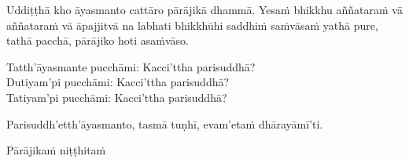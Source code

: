 \medskip

\begin{center}
Uddiṭṭhā kho āyasmanto cattāro pārājikā dhammā. Yesaṁ bhikkhu aññataraṁ vā aññataraṁ vā āpajjitvā na labhati bhikkhūhi saddhiṁ saṁvāsaṁ yathā pure, tathā pacchā, pārājiko hoti asaṁvāso.

\smallskip

Tatth'āyasmante pucchāmi: Kacci'ttha parisuddhā?\\
Dutiyam'pi pucchāmi: Kacci'ttha parisuddhā?\\
Tatiyam'pi pucchāmi: Kacci'ttha parisuddhā?

\smallskip

Parisuddh'etth'āyasmanto, tasmā tuṇhī, evam'etaṁ dhārayāmī'ti.
\end{center}

\begin{outro}
Pārājikaṁ niṭṭhitaṁ
\end{outro}

\clearpage
